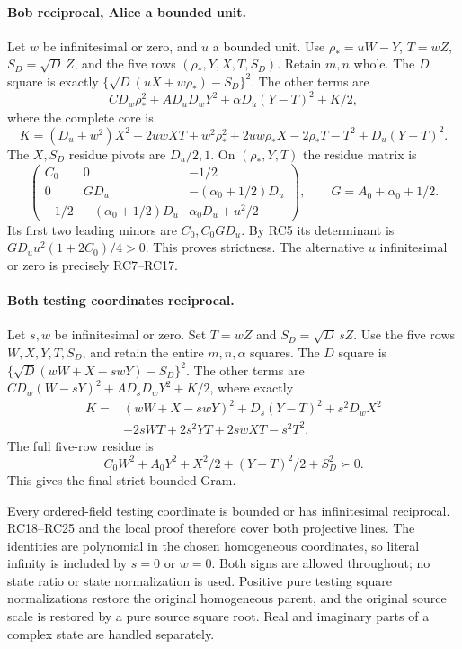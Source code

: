 \paragraph{Bob reciprocal, Alice a bounded unit.}
Let $w$ be infinitesimal or zero, and $u$ a bounded unit. Use
$\rho_*=uW-Y$, $T=wZ$, $S_D=\sqrt D\,Z$, and the five rows
$(\rho_*,Y,X,T,S_D)$. Retain $m,n$ whole. The $D$ square is
exactly $\{\sqrt D(uX+w\rho_*)-S_D\}^2$. The other terms are
\[
 CD_w\rho_*^2+AD_uD_wY^2+\alpha D_u(Y-T)^2+K/2,
\]
where the complete core is
\[
 K=(D_u+w^2)X^2+2uwX T+w^2\rho_*^2+2uw\rho_*X
                           -2\rho_*T-T^2+D_u(Y-T)^2.
 \tag{RC22}
\]
The $X,S_D$ residue pivots are $D_u/2,1$. On
$(\rho_*,Y,T)$ the residue matrix is
\[
 \begin{pmatrix}
 C_0&0&-1/2\\
 0&G D_u&-(\alpha_0+1/2)D_u\\
 -1/2&-(\alpha_0+1/2)D_u&\alpha_0D_u+u^2/2
 \end{pmatrix},\qquad G=A_0+\alpha_0+1/2.
 \tag{RC23}
\]
Its first two leading minors are $C_0,C_0GD_u$. By RC5 its
determinant is $GD_uu^2(1+2C_0)/4>0$. This proves strictness.
The alternative $u$ infinitesimal or zero is precisely RC7--RC17.

\paragraph{Both testing coordinates reciprocal.}
Let $s,w$ be infinitesimal or zero. Set $T=wZ$ and
$S_D=\sqrt D\,sZ$. Use the five rows $W,X,Y,T,S_D$, and retain the
entire $m,n,\alpha$ squares. The $D$ square is
$\{\sqrt D(wW+X-swY)-S_D\}^2$. The other terms are
$CD_w(W-sY)^2+AD_sD_wY^2+K/2$, where exactly
\[
\begin{split}
 K={}&(wW+X-swY)^2+D_s(Y-T)^2+s^2D_wX^2\\
 &-2sWT+2s^2YT+2swXT-s^2T^2.
\end{split}\tag{RC24}
\]
The full five-row residue is
\[
 C_0W^2+A_0Y^2+X^2/2+(Y-T)^2/2+S_D^2\succ0.
 \tag{RC25}
\]
This gives the final strict bounded Gram.

Every ordered-field testing coordinate is bounded or has
infinitesimal reciprocal. RC18--RC25 and the local proof therefore
cover both projective lines. The identities are polynomial in the
chosen homogeneous coordinates, so literal infinity is included by
$s=0$ or $w=0$. Both signs are allowed throughout; no state ratio
or state normalization is used. Positive pure testing square
normalizations restore the original homogeneous parent, and the
original source scale is restored by a pure source square root.
Real and imaginary parts of a complex state are handled separately.



